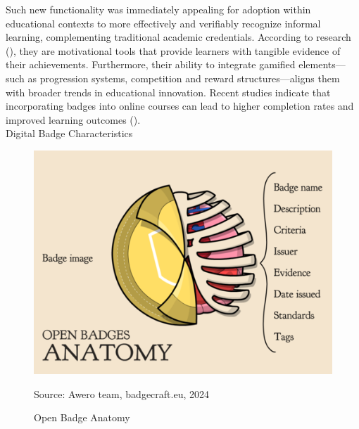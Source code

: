 Such new functionality was immediately appealing for adoption within educational contexts to more effectively and verifiably recognize informal learning, complementing traditional academic credentials. 
According to research (\cite{areBadgesUseful}), they are motivational tools that provide learners with tangible evidence of their achievements. 
Furthermore, their ability to integrate gamified elements—such as progression systems, competition and reward structures—aligns them with broader trends in educational innovation. 
Recent studies indicate that incorporating badges into online courses can lead to higher completion rates and improved learning outcomes (\cite{higherRates}).\\
{Digital Badge Characteristics}
%
\begin{figure}[htbp]
 \centering
 \includegraphics[width=14cm]{Media/OpenBadgeAnatomy.png}
 \caption{Open Badge Anatomy}
 \label{fig:badgeAnatomy}
 {\raggedright \small{Source: Awero team, badgecraft.eu, 2024}\par}
\end{figure}
%
